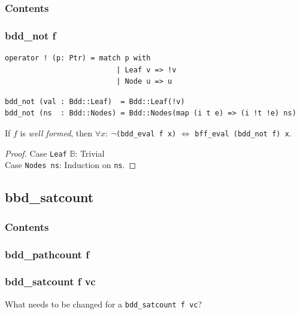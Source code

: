 \documentclass[english, aspectratio=169]{beamer}
\newcommand{\B}[0]{\ensuremath{\mathbb{B}}}
\begin{document}
\begin{frame}{}
  \frametitle{Contents}
\end{frame}

\begin{frame}[fragile]
  \frametitle{bdd\_not f}

  \begin{lstlisting}
operator ! (p: Ptr) = match p with
                          | Leaf v => !v
                          | Node u => u
  \end{lstlisting}
  \begin{lstlisting}[firstnumber=4]
bdd_not (val : Bdd::Leaf)  = Bdd::Leaf(!v)
bdd_not (ns  : Bdd::Nodes) = Bdd::Nodes(map (i t e) => (i !t !e) ns)
  \end{lstlisting}

  \pause

  \begin{theorem}
    If $f$ is \emph{well formed}, then $\forall x$: $\neg$\texttt{(bdd\_eval f x)} $\iff$
    \texttt{bff\_eval (bdd\_not f) x}.
  \end{theorem}
  \begin{proof}
    Case \texttt{Leaf} $\B$: Trivial\\
    Case \texttt{Nodes ns}: Induction on \texttt{ns}.
  \end{proof}
\end{frame}

\subsection{bbd\_satcount}

\begin{frame}{}
  \frametitle{Contents}
\end{frame}

\begin{frame}
  \frametitle{bdd\_pathcount f}

  
\end{frame}

\begin{frame}{}
  \frametitle{bdd\_satcount f vc}

  \begin{center}
    \Huge

    What needs to be changed for a \texttt{bdd\_satcount f vc}?
  \end{center}
\end{frame}
\end{document}
